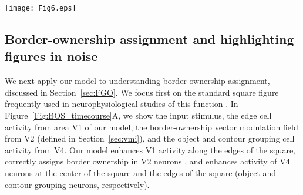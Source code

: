 \begin{figure*}[t]
\begin{center}
\texttt{[image: Fig6.eps]}
\end{center}
\caption{Figure-ground segregation of a square object as in
  the~\citet{Zhou_etal00} experiments. (A) Shown left to right are the
  input 
  stimulus, the edge cell activity (E), the border ownership
  assignment along edges (shown as the vector modulation index 
  $\protect\vv{\mathbf{v}}$,
  section~\ref{sec:vmi}),
 the object grouping 
  neuron activity 
$(G_o)$
 and the contour grouping activity
$(G_c)$.
 Activities are normalized within each map, and warmer colors
  indicate higher activity (see color bar at right). (B) Time course
  of normalized border-ownership cell activity for the preferred
  side-of-figure (red) and non-preferred side-of-figure (blue) for the
  receptive field marked by the yellow circle in panel A. Here, the
  preferred side-of-figure is to the right. (C) Timing of the
  normalized border-ownership signal (red) and the edge signal
  (black). The BOS signal is defined as the difference in activities
  of the two opposing pairs of border-ownership cells in panel B. The
  edge signal is defined as the sum of the activities of the two
  border-ownership cells. The curves are normalized to the same scale (0--1) to show the time course of the responses.}
\label{Fig:BOS_timecourse}
\end{figure*}

\subsection{Border-ownership assignment and highlighting figures in
  noise} 
\label{sec:BOS}
We next apply our model to understanding border-ownership assignment,
discussed in Section~\ref{sec:FGO}. We focus first on the standard
square figure frequently used in neurophysiological studies of this
function
\citep{Zhou_etal00,Qiu_etal07,Sugihara_etal11,Williford_vonderHeydt13,Williford_vonderHeydt14,Martin_vonderHeydt15}.
In Figure~\ref{Fig:BOS_timecourse}A, we show the input stimulus, the edge cell
activity from area V1 of our model, the border-ownership vector
modulation field from V2 (defined in Section~\ref{sec:vmi}), and the
object and contour grouping cell activity from V4. 
Our model enhances V1 activity along the edges of
the square, correctly assigns border ownership
 in V2 neurons \citep[in agreement with][] {Zhou_etal00},
and enhances activity of V4 neurons at the center of the square and the
edges of the square (object and contour grouping neurons,
respectively). 

